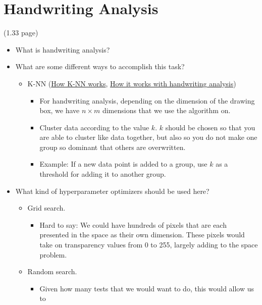 \documentclass[stu,12pt,floatsintext]{apa7}
\begin{document}
\section{Handwriting Analysis}
(1.33 page)

\begin{itemize}
    \item What is handwriting analysis?
    \item What are some different ways to accomplish this task?
    \begin{itemize}
        \item K-NN (\href{https://www.geeksforgeeks.org/machine-learning/k-nearest-neighbours/#}{How K-NN works}, \href{https://medium.com/@sammedapatil003/handwritten-digit-recognition-2fa1ae839305}{How it works with handwriting analysis})
        \begin{itemize}
            \item For handwriting analysis, depending on the dimension of the drawing box, we have \(n \times m\) dimensions that we use the algorithm on.
            \item Cluster data according to the value \(k\). \(k\) should be chosen so that you are able to cluster like data together, but also so you do not make one group so dominant that others are overwritten.
            \item Example: If a new data point is added to a group, use \(k\) as a threshold for adding it to another group.
        \end{itemize}
    \end{itemize}
    \item What kind of hyperparameter optimizers should be used here?
    \begin{itemize}
        \item Grid search.
        \begin{itemize}
            \item Hard to say: We could have hundreds of pixels that are each presented in the space as their own dimension. These pixels would take on transparency values from 0 to 255, largely adding to the space problem.
        \end{itemize}
        \item Random search.
        \begin{itemize}
            \item Given how many tests that we would want to do, this would allow us to 
        \end{itemize}
    \end{itemize}
\end{itemize}
\end{document}
